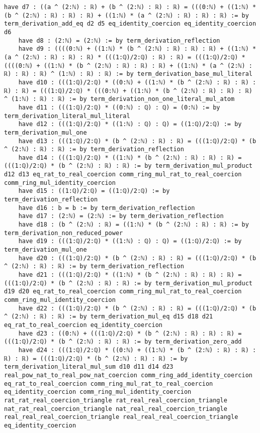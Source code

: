 \documentclass{article}
\begin{document}
\begin{tcolorbox}[colback=white!10, width=\linewidth]
\begin{lstlisting}[language=Lean4]
    have d7 : ((a ^ (2:ℕ) : ℝ) + (b ^ (2:ℕ) : ℝ) : ℝ) = (((0:ℕ) + ((1:ℕ) * (b ^ (2:ℕ) : ℝ) : ℝ) : ℝ) + ((1:ℕ) * (a ^ (2:ℕ) : ℝ) : ℝ) : ℝ) := by term_derivation_add_eq d2 d5 eq_identity_coercion eq_identity_coercion d6
    have d8 : (2:ℕ) = (2:ℕ) := by term_derivation_reflection
    have d9 : ((((0:ℕ) + ((1:ℕ) * (b ^ (2:ℕ) : ℝ) : ℝ) : ℝ) + ((1:ℕ) * (a ^ (2:ℕ) : ℝ) : ℝ) : ℝ) * (((1:ℚ)/2:ℚ) : ℝ) : ℝ) = (((1:ℚ)/2:ℚ) * ((((0:ℕ) + ((1:ℕ) * (b ^ (2:ℕ) : ℝ) : ℝ) : ℝ) + ((1:ℕ) * (a ^ (2:ℕ) : ℝ) : ℝ) : ℝ) ^ (1:ℕ) : ℝ) : ℝ) := by term_derivation_base_mul_literal
    have d10 : (((1:ℚ)/2:ℚ) * ((0:ℕ) + ((1:ℕ) * (b ^ (2:ℕ) : ℝ) : ℝ) : ℝ) : ℝ) = (((1:ℚ)/2:ℚ) * (((0:ℕ) + ((1:ℕ) * (b ^ (2:ℕ) : ℝ) : ℝ) : ℝ) ^ (1:ℕ) : ℝ) : ℝ) := by term_derivation_non_one_literal_mul_atom
    have d11 : (((1:ℚ)/2:ℚ) * ((0:ℕ) : ℚ) : ℚ) = (0:ℕ) := by term_derivation_literal_mul_literal
    have d12 : (((1:ℚ)/2:ℚ) * ((1:ℕ) : ℚ) : ℚ) = ((1:ℚ)/2:ℚ) := by term_derivation_mul_one
    have d13 : (((1:ℚ)/2:ℚ) * (b ^ (2:ℕ) : ℝ) : ℝ) = (((1:ℚ)/2:ℚ) * (b ^ (2:ℕ) : ℝ) : ℝ) := by term_derivation_reflection
    have d14 : (((1:ℚ)/2:ℚ) * ((1:ℕ) * (b ^ (2:ℕ) : ℝ) : ℝ) : ℝ) = (((1:ℚ)/2:ℚ) * (b ^ (2:ℕ) : ℝ) : ℝ) := by term_derivation_mul_product d12 d13 eq_rat_to_real_coercion comm_ring_mul_rat_to_real_coercion comm_ring_mul_identity_coercion
    have d15 : ((1:ℚ)/2:ℚ) = ((1:ℚ)/2:ℚ) := by term_derivation_reflection
    have d16 : b = b := by term_derivation_reflection
    have d17 : (2:ℕ) = (2:ℕ) := by term_derivation_reflection
    have d18 : (b ^ (2:ℕ) : ℝ) = ((1:ℕ) * (b ^ (2:ℕ) : ℝ) : ℝ) := by term_derivation_non_reduced_power
    have d19 : (((1:ℚ)/2:ℚ) * ((1:ℕ) : ℚ) : ℚ) = ((1:ℚ)/2:ℚ) := by term_derivation_mul_one
    have d20 : (((1:ℚ)/2:ℚ) * (b ^ (2:ℕ) : ℝ) : ℝ) = (((1:ℚ)/2:ℚ) * (b ^ (2:ℕ) : ℝ) : ℝ) := by term_derivation_reflection
    have d21 : (((1:ℚ)/2:ℚ) * ((1:ℕ) * (b ^ (2:ℕ) : ℝ) : ℝ) : ℝ) = (((1:ℚ)/2:ℚ) * (b ^ (2:ℕ) : ℝ) : ℝ) := by term_derivation_mul_product d19 d20 eq_rat_to_real_coercion comm_ring_mul_rat_to_real_coercion comm_ring_mul_identity_coercion
    have d22 : (((1:ℚ)/2:ℚ) * (b ^ (2:ℕ) : ℝ) : ℝ) = (((1:ℚ)/2:ℚ) * (b ^ (2:ℕ) : ℝ) : ℝ) := by term_derivation_mul_eq d15 d18 d21 eq_rat_to_real_coercion eq_identity_coercion
    have d23 : ((0:ℕ) + (((1:ℚ)/2:ℚ) * (b ^ (2:ℕ) : ℝ) : ℝ) : ℝ) = (((1:ℚ)/2:ℚ) * (b ^ (2:ℕ) : ℝ) : ℝ) := by term_derivation_zero_add
    have d24 : (((1:ℚ)/2:ℚ) * ((0:ℕ) + ((1:ℕ) * (b ^ (2:ℕ) : ℝ) : ℝ) : ℝ) : ℝ) = (((1:ℚ)/2:ℚ) * (b ^ (2:ℕ) : ℝ) : ℝ) := by term_derivation_literal_mul_sum d10 d11 d14 d23 real_pow_nat_to_real_pow_nat_coercion comm_ring_add_identity_coercion eq_rat_to_real_coercion comm_ring_mul_rat_to_real_coercion eq_identity_coercion comm_ring_mul_identity_coercion rat_rat_real_coercion_triangle rat_real_real_coercion_triangle nat_rat_real_coercion_triangle nat_real_real_coercion_triangle real_real_real_coercion_triangle real_real_real_coercion_triangle eq_identity_coercion

\end{lstlisting}
\end{tcolorbox}
\end{document}
